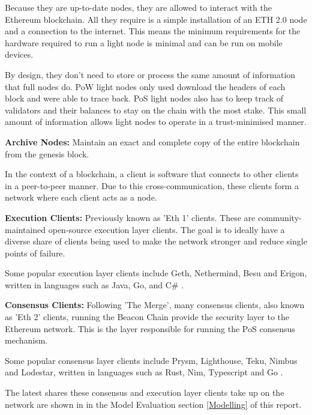 Because they are up-to-date nodes, they are allowed to interact with the Ethereum blockchain.  All they require is a simple installation of an ETH 2.0 node and a connection to the internet. This means the minimum requirements for the hardware required to run a light node is minimal and can be run on mobile devices.

By design, they don't need to store or process the same amount of information that full nodes do. PoW light nodes only used download the headers of each block and were able to trace back. PoS light nodes also has to keep track of validators and their balances to stay on the chain with the most stake. This small amount of information allows light nodes to operate in a trust-minimised manner.

\textbf{Archive Nodes:}
Maintain an exact and complete copy of the entire blockchain from the genesis block. 

In the context of a blockchain, a client is software that connects to other clients in a peer-to-peer manner. Due to this cross-communication, these clients form a network where each client acts as a node. 

\textbf{Execution Clients: }
Previously known as 'Eth 1' clients. These are community-maintained open-source execution layer clients. The goal is to ideally have a diverse share of clients being used to make the network stronger and reduce single points of failure.

Some popular execution layer clients include Geth, Nethermind, Besu and Erigon, written in languages such as Java, Go, and C\# \cite{EthereumEthereum.org}. 

\textbf{Consensus Clients: }
Following 'The Merge', many consensus clients, also known as 'Eth 2' clients, running the Beacon Chain provide the security layer to the Ethereum network. This is the layer responsible for running the PoS consensus mechanism.

Some popular consensus layer clients include Prysm, Lighthouse, Teku, Nimbus and Lodestar, written in languages 
 such as Rust, Nim, Typescript and Go \cite{EthereumEthereum.org}. 

The latest shares these consensus and execution layer clients take up on the network are shown in  in the Model Evaluation section \ref{Modelling} of this report.






